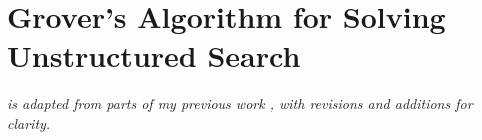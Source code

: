 

\section{Grover's Algorithm for Solving Unstructured Search}\label{sec:grovers_explanation}
\textit{ is adapted from parts of my previous work \cite{ownwork}, with revisions and additions for clarity.}

